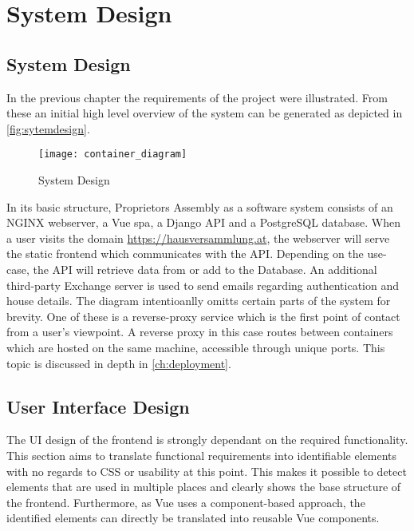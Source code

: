 \chapter[System Design]{System Design}

\section{System Design}
In the previous chapter the requirements of the project were illustrated. From these an initial high level overview of the system can be generated as depicted in \autoref{fig:sytemdesign}.


\begin{figure}[H]
    \begin{center}
    \texttt{[image: container\_diagram]}
    \end{center}
    \caption{System Design}
    \label{fig:sytemdesign}
\end{figure}

In its basic structure, Proprietors Assembly as a software system consists of an NGINX webserver, a Vue \acrlong{spa}, a Django API and a PostgreSQL database. When a user visits the domain \url{https://hausversammlung.at}, the webserver will serve the static frontend which communicates with the API. Depending on the use-case, the API will retrieve data from or add to the Database. An additional third-party Exchange server is used to send emails regarding authentication and house details. The diagram intentioanlly omitts certain parts of the system for brevity. One of these is a reverse-proxy service which is the first point of contact from a user's viewpoint. A reverse proxy in this case routes between containers which are hosted on the same machine, accessible through unique ports. This topic is discussed in depth in \autoref{ch:deployment}.

\section{User Interface Design}
The UI design of the frontend is strongly dependant on the required functionality. This section aims to translate functional requirements into identifiable elements with no regards to CSS or usability at this point. This makes it possible to detect elements that are used in multiple places and clearly shows the base structure of the frontend. Furthermore, as Vue uses a component-based approach, the identified elements can directly be translated into reusable Vue components.


